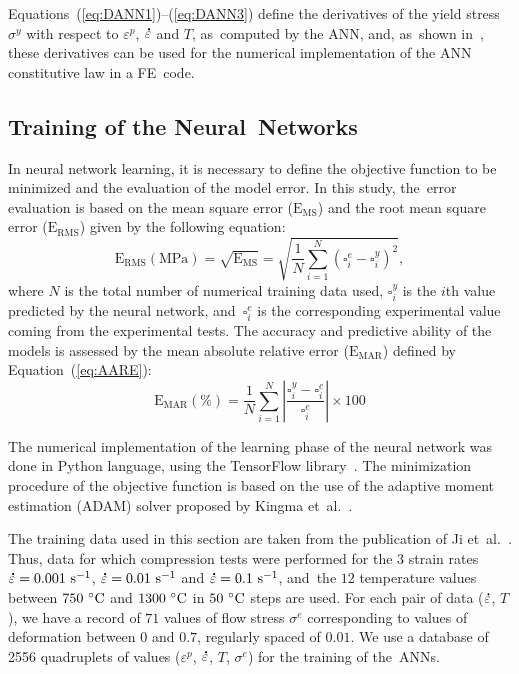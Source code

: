 \documentclass[algorithms,article,accept,pdftex,oneauthors]{Definitions/mdpi}
\DeclareRobustCommand{\mdot}[1]{\accentset{\mbox{\bfseries .}}{#1}}
\DeclareRobustCommand{\MSE}{\text{E}_\text{MS}}
\DeclareRobustCommand{\RMSE}{\text{E}_\text{RMS}}
\DeclareRobustCommand{\MARE}{\text{E}_\text{MAR}}
\DeclareRobustCommand{\ps}{\text{s}^{-1}}
\DeclareRobustCommand{\MPa}{\text{MPa}}
\begin{document}
Equations~(\ref{eq:DANN1})--(\ref{eq:DANN3}) define the derivatives of the yield stress $\sigma^y$ with respect to $\varepsilon^p$, $\mdot\varepsilon$ and $T$, as~computed by the ANN, and, as~shown in~\cite{Pantale-2021}, these derivatives can be used for the numerical implementation of the ANN constitutive law in a FE~code.

\subsection{Training of the Neural~Networks}\label{sec:ANN-traning}

In neural network learning, it is necessary to define the objective function to be minimized and the evaluation of the model error.
In this study, the~error evaluation is based on the mean square error ($\MSE$) and the root mean square error ($\RMSE$) given by the following equation:
\begin{equation}
\RMSE (\MPa) = \sqrt{\MSE} = \sqrt{\frac{1}{N} \sum_{i=1}^{N} \left(\square_i^e - \square_i^y\right)^2}, \label{eq:RMSE}
\end{equation}
where $N$ is the total number of numerical training data used, $\square_i^y$ is the $i${{th}} value predicted by the neural network, and~$\square_i^e$ is the corresponding experimental value coming from the experimental tests.
The accuracy and predictive ability of the models is assessed by the mean absolute relative error ($\MARE$) defined by Equation~(\ref{eq:AARE}):
\begin{equation}
\MARE(\%) = \frac{1}{N} \sum_{i=1}^{N}{\left|\frac{\square_i^y -\square_i^e}{\square_i^e}\right|} \times 100 \label{eq:AARE}
\end{equation}

The numerical implementation of the learning phase of the neural network was done in Python language, using the TensorFlow library~\cite{Abadi-2016, Mattmann-2020}.
The minimization procedure of the objective function is based on the use of the adaptive moment estimation (ADAM) solver proposed by Kingma et~al.~\cite{Kingma-2015}.

The training data used in this section are taken from the publication of Ji et~al.~\cite{Ji-2018}.
Thus, data for which compression tests were performed for the $3$ strain rates $\mdot\varepsilon=0.001~\ps$, $\mdot\varepsilon=0.01~\ps$ and $\mdot\varepsilon=0.1~\ps$, and~the $12$ temperature values between $750~\celsius$ and $1300~\celsius$ in $50~\celsius$ steps are used.
For each pair of data ($\mdot\varepsilon$, $T$), we have a record of $71$ values of flow stress $\sigma^e$ corresponding to values of deformation between $0$ and $0.7$, regularly spaced of $0.01$.
We use a database of 2556 quadruplets of values ($\varepsilon^p$, $\mdot\varepsilon$, $T$, $\sigma^e$) for the training of the~ANNs.
\end{document}
